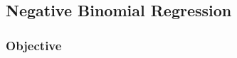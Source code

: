 \begin{comment}
While one of the primary advantages of Bayesian models is computing a full distribution rather than only a point estimate, we can generate point estimates by taking the mean of the sample distribution of predictions for each model as their respective point estimate predictions to be compared to the actual data. The models are then compared by their mean squared error (MSE), with the results shown in Table ??. There are two key features that stand out in the results in Table ??. First, both the no pooling model and the partial pooling model have lower MSEs in both training and testing. This indicates that the completely pooled model is underfit and that the no pooling and partial pooling model do improve model fit by including group parameters (team ratings in this specific case). Second, the no pooling model provides the best model fit on the training data, but provides worse model fit than the partial pooling model on the test data. This shows the effect of regularization via shrinkage to the mean that was theoretical discussed earlier in section ??. These results give empirical evidence that multilevel models and their partial pooling provide improved model fit while protecting against overfitting, and is the reason we opted to use a multilevel model as the model of choice for inferring home advantage in this thesis.
\end{comment}

\subsection{Negative Binomial Regression} \label{experiment_2}

\subsubsection*{Objective}

